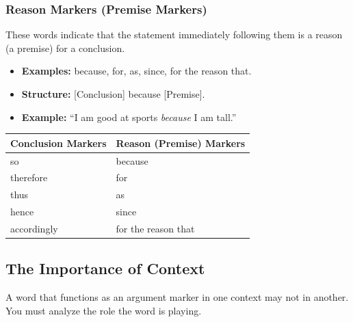 \documentclass[12pt]{article}
\begin{document}
\subsubsection{Reason Markers (Premise Markers)}
These words indicate that the statement immediately following them is a reason (a premise) for a conclusion.
\begin{itemize}
    \item \textbf{Examples:} because, for, as, since, for the reason that.
    \item \textbf{Structure:} [Conclusion] because [Premise].
    \item \textbf{Example:} ``I am good at sports \textit{because} I am tall.''
\end{itemize}

\begin{tcolorbox}[colback=blue!5!white,colframe=blue!75!black,title=Argument Markers]
    \begin{tabularx}{\linewidth}{@{}XX@{}}
        \toprule
        \textbf{Conclusion Markers} & \textbf{Reason (Premise) Markers} \\
        \midrule
        so                          & because                           \\
        therefore                   & for                               \\
        thus                        & as                                \\
        hence                       & since                             \\
        accordingly                 & for the reason that               \\
        \bottomrule
    \end{tabularx}
\end{tcolorbox}

\subsection{The Importance of Context}
A word that functions as an argument marker in one context may not in another. You must analyze the role the word is playing.
\end{document}
